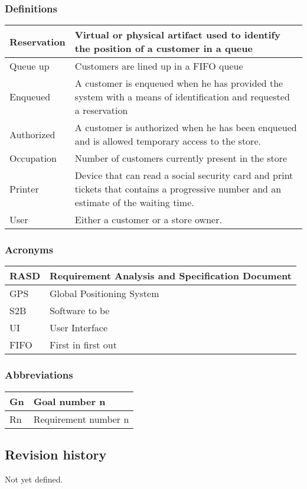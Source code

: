 \subsubsection{Definitions}
\begin{tabular}{ | m{5cm} | m{10cm} | }
	\hline
	Reservation & Virtual or physical artifact used to identify the position of a customer in a queue \\
	\hline
	Queue up & Customers are lined up in a FIFO queue\\
	\hline
	Enqueued & A customer is enqueued when he has provided the system with a means of identification and requested a reservation\\
	\hline
	Authorized & A customer is authorized when he has been enqueued and is allowed temporary access to the store.\\
	\hline
	Occupation & Number of customers currently present in the store\\
	\hline
	Printer & Device that can read a social security card and print tickets that contains a progressive number and an estimate of the waiting time.\\
	\hline
	User & Either a customer or a store owner.\\
	\hline
\end{tabular}
\subsubsection{Acronyms}
\begin{tabular}{ | m{5cm} | m{10cm} | }
	\hline
	RASD & Requirement Analysis and Specification Document \\
	\hline
	GPS & Global Positioning System \\
	\hline
	S2B & Software to be \\
	\hline
	UI & User Interface\\
	\hline
	FIFO & First in first out\\
	\hline
\end{tabular}
\subsubsection{Abbreviations}
\begin{tabular}{ | m{5cm} | m{10cm} | }
	\hline
	Gn & Goal number n \\%
	\hline
	Rn & Requirement number n \\
	\hline
\end{tabular}
\subsection{Revision history}
Not yet defined.
